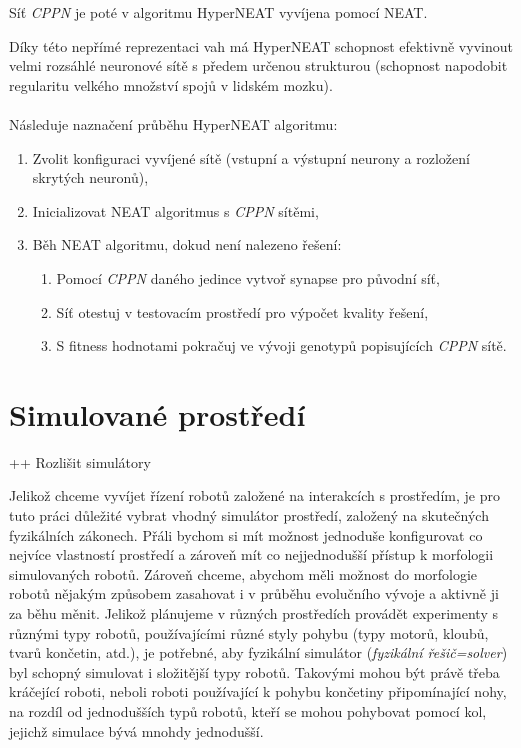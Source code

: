 Síť \emph{CPPN} je poté v algoritmu HyperNEAT vyvíjena pomocí NEAT.

Díky této nepřímé reprezentaci vah má HyperNEAT schopnost efektivně vyvinout
velmi rozsáhlé neuronové sítě s předem určenou strukturou (schopnost napodobit
regularitu velkého množství spojů v lidském mozku).

\paragraph{}
Následuje naznačení průběhu HyperNEAT algoritmu:
\begin{enumerate}
    \item Zvolit konfiguraci vyvíjené sítě (vstupní a výstupní neurony a
        rozložení skrytých neuronů),
    \item Inicializovat NEAT algoritmus s \emph{CPPN} sítěmi,
    \item Běh NEAT algoritmu, dokud není nalezeno řešení:
        \begin{enumerate}
            \item Pomocí \emph{CPPN} daného jedince vytvoř synapse pro původní
                síť,
            \item Síť otestuj v testovacím prostředí pro výpočet kvality
                řešení,
            \item S fitness hodnotami pokračuj ve vývoji genotypů popisujících
                \emph{CPPN} sítě.
        \end{enumerate}
\end{enumerate}

\section{Simulované prostředí} \label{Simulované prostředí}

++ Rozlišit simulátory

Jelikož chceme vyvíjet řízení robotů založené na interakcích s prostředím, je
pro tuto práci důležité vybrat vhodný simulátor prostředí, založený na
skutečných fyzikálních zákonech. Přáli bychom si mít možnost jednoduše
konfigurovat co nejvíce vlastností prostředí a zároveň mít co nejjednodušší
přístup k morfologii simulovaných robotů. Zároveň chceme, abychom měli možnost
do morfologie robotů nějakým způsobem zasahovat i v průběhu evolučního vývoje a
aktivně ji za běhu měnit. Jelikož plánujeme v různých prostředích provádět
experimenty s různými typy robotů, používajícími různé styly pohybu (typy
motorů, kloubů, tvarů končetin, atd.), je potřebné, aby fyzikální simulátor
(\emph{fyzikální řešič=solver}) byl schopný simulovat i složitější typy robotů.
Takovými mohou být právě třeba kráčející roboti, neboli roboti používající k
pohybu končetiny připomínající nohy, na rozdíl od jednodušších typů robotů,
kteří se mohou pohybovat pomocí kol, jejichž simulace bývá mnohdy jednodušší. 

